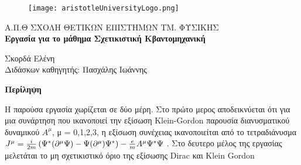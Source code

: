 \documentclass[12pt,oneside,titlepage,a4paper]{article}
\newcommand{\rbr}{
  \ensuremath{\right) }
}
\newcommand{\lbr}{
  \ensuremath{\left( }
}
\renewenvironment{abstract}[1][1.0]
{
	\begin{center}
		{\bf Περίληψη}\\[12pt]
		\begin{minipage}{#1\textwidth}
}
{
		\end{minipage}
	\end{center}
}
\begin{document}

\begin{titlepage}
	\begin{figure}[H]
		\centering
		\texttt{[image: aristotleUniversityLogo.png]}
	\end{figure}
	
	\begin{center}
		\large{{\sc Α.Π.Θ} ΣΧΟΛΗ ΘΕΤΙΚΩΝ ΕΠΙΣΤΗΜΩΝ ΤΜ. ΦΥΣΙΚΗΣ}\\[0.5cm]
		\LARGE\textbf{Εργασία για το μάθημα Σχετικιστική Κβαντομηχανική}\\[1.0cm] 

		\vspace{0.0cm}

		\small{Σκορδά Ελένη}\\[0.2cm]
               
		\small{Διδάσκων καθηγητής: Πασχάλης Ιωάννης }\\[0.2cm]

	\end{center}

	\begin{abstract}
	  Η παρούσα εργασία χωρίζεται σε δύο μέρη. Στο πρώτο μερος αποδεικνύεται ότι για μια συνάρτηση που ικανοποιεί την εξίσωση \textlatin{Klein-Gordon} παρουσία διανυσματικού δυναμικού $A^\mu$, μ = 0,1,2,3, η εξίσωση συνέχειας ικανοποιείται από το τετραδιάνυσμα $J^\mu =\frac{i}{2m} \lbr \Psi^* (\partial^\mu \Psi)-\Psi(\partial^\mu)\Psi^* \rbr - \frac{e}{m}A^\mu \Psi^* \Psi$ . Στο δευτερο μέλος της εργασίας μελετάται το μη σχετικιστικό όριο της εξίσωσης \textlatin{Dirac} και \textlatin{Klein Gordon}  
          
	\end{abstract}
        
	\vfill

\end{titlepage}

\newpage


\tableofcontents
\newpage



\pagebreak

\pagebreak

\pagebreak

\pagebreak

\pagebreak

\pagebreak
\end{document}
